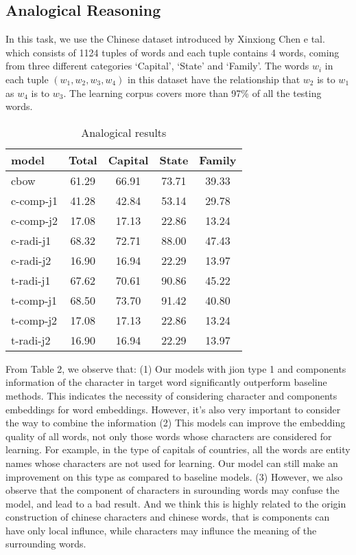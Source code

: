 \subsection{Analogical Reasoning}
In this task, we use the Chinese dataset introduced by Xinxiong Chen e tal. which consists of 1124 tuples of words and each tuple contains 4 words, coming from three different categories `Capital', `State' and `Family'. The words $w_i$ in each tuple $(w_1, w_2, w_3, w_4)$ in this dataset have the relationship that $w_2$ is to $w_1$ as $w_4$ is to $w_3$. The learning corpus covers more than 97\% of all the testing words. 
\begin{table}[h]
\begin{center}
\begin{tabular}{lcccc}
\hline \bf model & \bf Total & \bf Capital & \bf State & \bf Family\\ \hline
cbow & 61.29 & 66.91 & 73.71 & 39.33 \\
c-comp-j1\footnotemark[1] & 41.28 & 42.84 & 53.14 & 29.78 \\   
c-comp-j2 & 17.08 & 17.13 & 22.86 & 13.24 \\
c-radi-j1 & 68.32 & 72.71 & 88.00 & 47.43 \\
c-radi-j2 & 16.90 & 16.94 & 22.29 & 13.97 \\
t-radi-j1  & 67.62 & 70.61 & 90.86 & 45.22 \\
t-comp-j1  & 68.50 & 73.70 & 91.42 & 40.80 \\
t-comp-j2 & 17.08 & 17.13 & 22.86 & 13.24 \\
t-radi-j2 & 16.90 & 16.94 & 22.29 & 13.97 \\
\hline
\end{tabular}
\end{center}
\caption{\label{font-table} Analogical results }
\end{table}
From Table 2, we observe that: (1) Our models with jion type 1 and components information of the character in target word significantly outperform baseline methods. This indicates the necessity of considering character and components embeddings for word embeddings. However, it's also very important to consider the way to combine the information (2) This models can improve the embedding quality of all words, not only those words whose characters are considered for learning. For example, in the type of capitals of countries, all the words are entity names whose characters are not used for learning. Our model can still make an improvement on this type as compared to baseline models. (3) However, we also observe that the component of characters in surounding words may confuse the model, and lead to a bad result. And we think this is highly related to the origin construction of chinese characters and chinese words, that is components can have only local influnce, while characters may influnce the meaning of the surrounding words.
